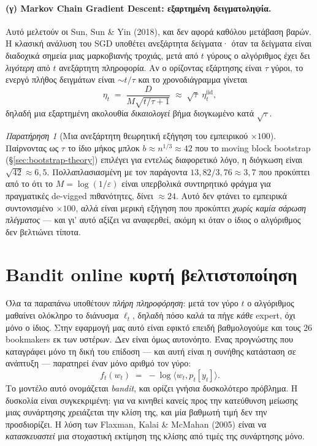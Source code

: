 \documentclass[12pt,a4paper,oneside]{report}
\renewcommand{\_}{\oldunderscore\allowbreak}
\theoremstyle{definition}
\theoremstyle{plain}
\theoremstyle{remark}
\newtheorem{remark}[theorem]{Παρατήρηση}
\begin{document}
\paragraph{(γ) Markov Chain Gradient Descent: εξαρτημένη δειγματοληψία.} Αυτό μελετούν οι
Sun, Sun \& Yin (2018), και δεν αφορά καθόλου μετάβαση βαρών. Η κλασική ανάλυση του SGD
υποθέτει ανεξάρτητα δείγματα· όταν τα δείγματα είναι διαδοχικά σημεία μιας μαρκοβιανής
τροχιάς, μετά από $t$ γύρους ο αλγόριθμος έχει δει \emph{λιγότερη} από $t$ ανεξάρτητη
πληροφορία. Αν ο ορίζοντας εξάρτησης είναι $\tau$ γύροι, το ενεργό πλήθος δειγμάτων είναι
$\sim t/\tau$ και το χρονοδιάγραμμα γίνεται
\[
\eta_t \;=\; \frac{D}{M\sqrt{t/\tau + 1}} \;\approx\; \sqrt{\tau}\;\eta_t^{\text{iid}},
\]
δηλαδή μια εξαρτημένη ακολουθία \emph{δικαιολογεί} βήμα διογκωμένο κατά $\sqrt{\tau}$.

\begin{remark}[Μια ανεξάρτητη θεωρητική εξήγηση του εμπειρικού $\times100$]
Παίρνοντας ως $\tau$ το ίδιο μήκος μπλοκ $b \approx n^{1/3} \approx 42$ που το moving block
bootstrap (\S\ref{sec:bootstrap-theory}) επιλέγει για εντελώς διαφορετικό λόγο, η διόγκωση
είναι $\sqrt{42}\approx 6{,}5$. Πολλαπλασιασμένη με τον παράγοντα $13{,}82/3{,}76 \approx
3{,}7$ που προκύπτει από το ότι το $M=\log(1/\varepsilon)$ είναι υπερβολικά συντηρητικό
φράγμα για πραγματικές de-vigged πιθανότητες, δίνει $\approx 24$. Αυτό δεν φτάνει το
εμπειρικά συντονισμένο $\times100$, αλλά είναι μερική εξήγηση που προκύπτει \emph{χωρίς
καμία σάρωση πλέγματος} --- και γι' αυτό αξίζει να αναφερθεί, ακόμη κι όταν ο ίδιος ο
αλγόριθμος δεν βελτιώνει τίποτα.
\end{remark}

\section{Bandit online κυρτή βελτιστοποίηση}
\label{sec:bandit-theory}

Όλα τα παραπάνω υποθέτουν \emph{πλήρη πληροφόρηση}: μετά τον γύρο $t$ ο αλγόριθμος μαθαίνει
ολόκληρο το διάνυσμα $\ell_t$, δηλαδή πόσο καλά τα πήγε \emph{κάθε} expert, όχι μόνο ο ίδιος.
Στην εφαρμογή μας αυτό είναι εφικτό επειδή βαθμολογούμε και τους $26$ bookmakers εκ των
υστέρων. Δεν είναι όμως αυτονόητο. Ένας προγνώστης που καταγράφει μόνο τη δική του επίδοση
--- και αυτή είναι η συνήθης κατάσταση σε ανάπτυξη --- παρατηρεί έναν μόνο αριθμό τον γύρο:
\[
f_t(w_t) \;=\; -\log\langle w_t, p_t[y_t]\rangle .
\]
Το μοντέλο αυτό ονομάζεται \emph{bandit}, και ορίζει γνήσια δυσκολότερο πρόβλημα. Η δυσκολία
είναι συγκεκριμένη: για να κινηθεί κανείς προς την κατεύθυνση μείωσης μιας συνάρτησης
χρειάζεται την κλίση της, και μία βαθμωτή τιμή δεν την προσδιορίζει. Η λύση των Flaxman,
Kalai \& McMahan (2005) είναι να \emph{κατασκευαστεί} μια στοχαστική εκτίμηση της κλίσης από
τιμές της συνάρτησης μόνο.
\end{document}
